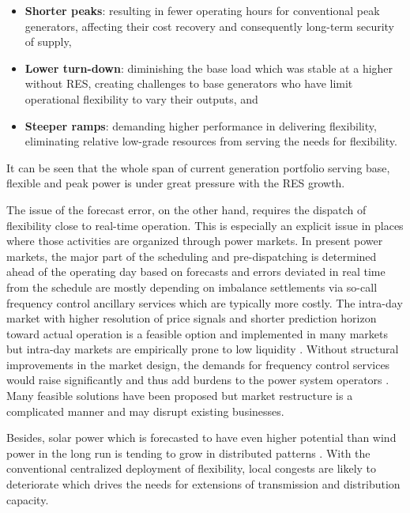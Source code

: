 \begin{itemize}
	\item \textbf{Shorter peaks}: resulting in fewer operating hours for conventional peak generators, affecting their cost recovery and consequently long-term security of supply,
	\item \textbf{Lower turn-down}: diminishing the base load which was stable at a higher without RES, creating challenges to base generators who have limit operational flexibility to vary their outputs, and
	\item \textbf{Steeper ramps}: demanding higher performance in delivering flexibility, eliminating relative low-grade resources from serving the needs for flexibility.
\end{itemize}

It can be seen that the whole span of current generation portfolio serving base, flexible and peak power is under great pressure with the RES growth.

The issue of the forecast error, on the other hand, requires the dispatch of flexibility close to real-time operation. This is especially an explicit issue in places where those activities are organized through power markets. In present power markets, the major part of the scheduling and pre-dispatching is determined ahead of the operating day based on forecasts and errors deviated in real time from the schedule are mostly depending on imbalance settlements via so-call frequency control ancillary services which are typically more costly\cite{Ranci2013,Srivastava2011}. The intra-day market with higher resolution of price signals and shorter prediction horizon toward actual operation is a feasible option and implemented in many markets\cite{Srivastava2011} but intra-day markets are empirically prone to low liquidity \cite{Lund2015, Hagemann2015}. Without structural improvements in the market design, the demands for frequency control services would raise significantly and thus add burdens to the power system operators \cite{GEEnergyConsulting2014,Krad2017}. Many feasible solutions have been proposed \cite{Woo2016,Gonzalez-Aparicio2015,Koch2009,Weber2010,Wartsila2014} but market restructure is a complicated manner and may disrupt existing businesses.

Besides, solar power which is forecasted to have even higher potential than wind power in the long run is tending to grow in distributed patterns \cite{Agency2016,Epia2016,Sawyer2016}. With the conventional centralized deployment of flexibility, local congests are likely to deteriorate \cite{Lund2015,STEINKE2013826} which drives the needs for extensions of transmission and distribution capacity.

